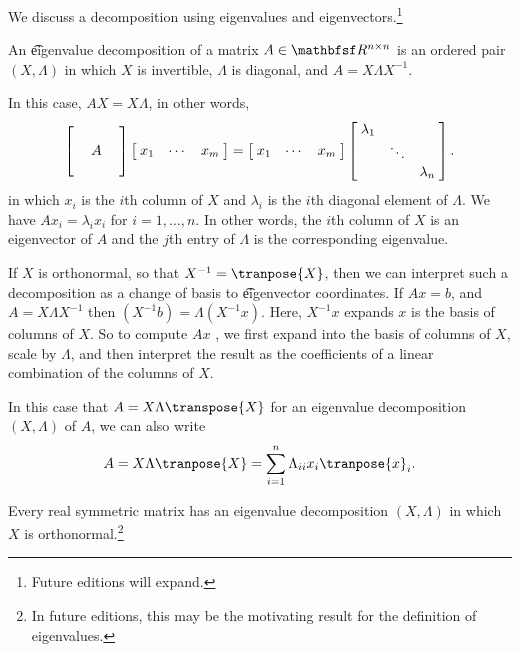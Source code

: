 

We discuss a decomposition using eigenvalues and eigenvectors.\footnote{Future editions will expand.}


An \t{eigenvalue decomposition} of a matrix $A \in \R^{n \times n}$ is an ordered pair $(X, \Lambda)$ in which $X$ is invertible, $\Lambda$ is diagonal, and $A = X\Lambda X^{-1}$.

In this case, $AX = X\Lambda$, in other words,
\[
  \bmat{ & & \\ & A & \\ & & }
  \bmat{x_1 & \cdots & x_m} =
  \bmat{x_1 & \cdots & x_m} \bmat{\lambda_1 & & \\ & \ddots & \\ & & \lambda_n}.
\]
in which $x_i$ is the $i$th column of $X$ and $\lambda_i$ is the $i$th diagonal element of $\Lambda$.
We have $Ax_i = \lambda_ix_i$ for $i = 1, \dots, n$.
In other words, the $i$th column of $X$ is an eigenvector of $A$ and the $j$th entry of $\Lambda$ is the corresponding eigenvalue.

If $X$ is orthonormal, so that $X^{-1} = \tranpose{X}$, then we can interpret such a decomposition as a change of basis to \t{eigenvector coordinates}.
If $Ax = b$, and $A = X\Lambda X^{-1}$ then $(X^{-1}b) = \Lambda(X^{-1}x)$.
Here, $X^{-1}x$ expands $x$ is the basis of columns of $X$.
So to compute $Ax$ , we first expand into the basis of columns of $X$, scale by $\Lambda$, and then interpret the result as the coefficients of a linear combination of the columns of $X$.

In this case that $A = X\Lambda\transpose{X}$ for an eigenvalue decomposition $(X, \Lambda)$ of $A$, we can also write
\[
  A = X\Lambda\tranpose{X} = \sum_{i =  1}^{n} \Lambda_{ii}x_i\tranpose{x}_i.
\]

\begin{proposition}
  Every real symmetric matrix has an eigenvalue decomposition $(X, \Lambda)$ in which $X$ is orthonormal.\footnote{In future editions, this may be the motivating result for the definition of eigenvalues.}
\end{proposition}
